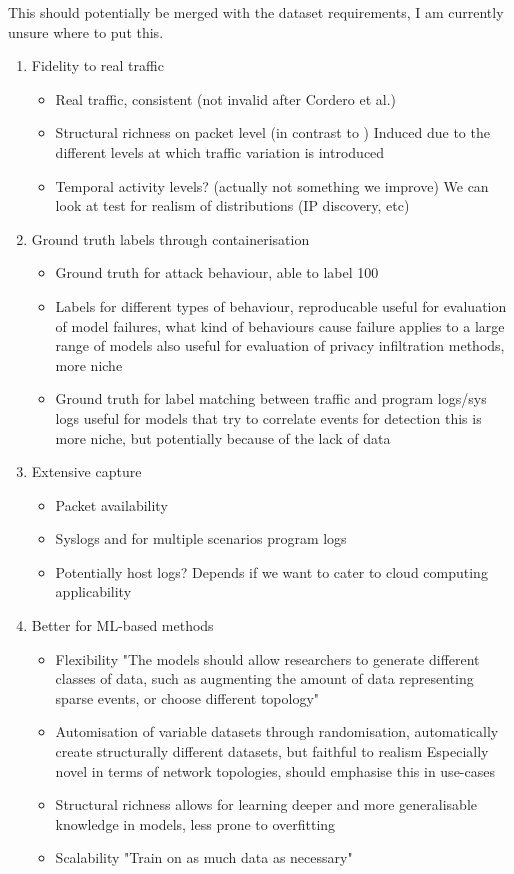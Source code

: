 \documentclass[sigconf]{acmart}
\begin{document}
This should potentially be merged with the dataset requirements, I am currently unsure where to put this. 
\begin{enumerate}
\item Fidelity to real traffic
\begin{itemize}
	\item Real traffic, consistent (not invalid after Cordero et al.)
	\item Structural richness on packet level (in contrast to )
		Induced due to the different levels at which traffic variation is introduced
	\item Temporal activity levels? (actually not something we improve)
			We can look at test for realism of distributions (IP discovery, etc)
\end{itemize}
\item Ground truth labels through containerisation
\begin{itemize}
	\item Ground truth for attack behaviour, able to label 100%
	\item Labels for different types of behaviour, reproducable
		useful for evaluation of model failures, what kind of behaviours cause failure
			applies to a large range of models
		also useful for evaluation of privacy infiltration methods, more niche
	\item Ground truth for label matching between traffic and program logs/sys logs
		useful for models that try to correlate events for detection
			this is more niche, but potentially because of the lack of data
\end{itemize}
\item Extensive capture
\begin{itemize}
	\item Packet availability
	\item Syslogs and for multiple scenarios program logs
	\item Potentially host logs? Depends if we want to cater to cloud computing applicability
\end{itemize}
\item Better for ML-based methods
\begin{itemize}
	\item Flexibility 
		"The models should allow researchers to generate different classes of data, such as augmenting the amount of data representing sparse events, or choose different topology"
	\item Automisation of variable datasets through randomisation, automatically create structurally different datasets, but faithful to realism
		Especially novel in terms of network topologies, should emphasise this in use-cases
	\item Structural richness 
			allows for learning deeper and more generalisable knowledge in models, less prone to overfitting
	\item Scalability
		"Train on as much data as necessary"
\end{itemize}

\end{enumerate}
\end{document}
